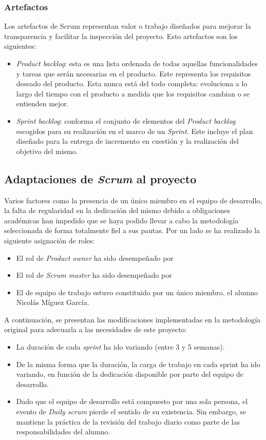 \subsubsection{Artefactos}
Los artefactos de Scrum representan valor o trabajo diseñados para mejorar la transparencia y facilitar la inspección del proyecto. Esto artefactos son los siguientes:
\begin{itemize}
    \item \textit{Product backlog}: esta es una lista ordenada de todas aquellas funcionalidades y tareas que serán necesarias en el producto. Este representa los requisitos deseado del producto. Esta nunca está del todo completa: evoluciona a lo largo del tiempo con el producto a medida que los requisitos cambian o se entienden mejor.
    \item \textit{Sprint backlog}: conforma el conjunto de elementos del \textit{Product backlog} escogidos para su realización en el marco de un \textit{Sprint}. Este incluye el plan diseñado para la entrega de incremento en cuestión y la realización del objetivo del mismo.
\end{itemize}
\subsection{Adaptaciones de \textit{Scrum} al proyecto}
Varios factores como la presencia de un único miembro en el equipo de desarrollo, la falta de regularidad en la dedicación del mismo debido a obligaciones académicas han impedido que se haya podido llevar a cabo la metodología seleccionada de forma totalmente fiel a sus pautas. Por un lado se ha realizado la siguiente asignación de roles:

\begin{itemize}
    \item El rol de \textit{Product owner} ha sido desempeñado por %
    \item El rol de \textit{Scrum master} ha sido desempeñado por %
    \item El de equipo de trabajo estuvo constituido por un único miembro, el alumno Nicolás Míguez García.
\end{itemize}
A continuación, se presentan las modificaciones implementadas en la metodología original para adecuarla a las necesidades de este proyecto:
\begin{itemize}
    \item La duración de cada \textit{sprint} ha ido variando (entre 3 y 5 semanas).
    \item De la misma forma que la duración, la carga de trabajo en cada sprint ha ido variando, en función de la dedicación disponible por parte del equipo de desarrollo.
    \item Dado que el equipo de desarrollo está compuesto por una sola persona, el evento de \textit{Daily scrum} pierde el sentido de su existencia. Sin embargo, se mantiene la práctica de la revisión del trabajo diario como parte de las responsabilidades del alumno.
\end{itemize}
